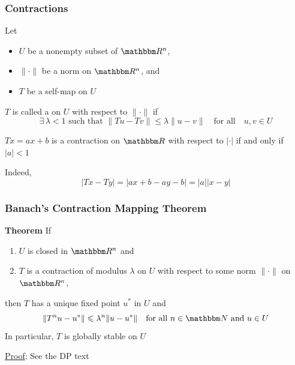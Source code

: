 \begin{frame}
    \frametitle{Contractions}
    
    Let 
    \begin{itemize}
        \item $U$ be a nonempty subset of $\RR^n$,
        \item $\| \cdot \|$ be a norm on $\RR^n$, and
        \item $T$ be a self-map on $U$

    \end{itemize}

    $T$ is called a  on $U$ with respect
    to $\| \cdot \|$ if 
    \begin{equation*}
        \text{$\exists \, \lambda < 1$ such that }
        \| Tu - Tv \| \leq \lambda \| u - v \| \quad \text{for all} \quad u, v \in U
    \end{equation*}

    \Eg $Tx = ax + b$ is a contraction on $\RR$ with respect to $| \cdot |$ 
    if and only if $|a|<1$

    Indeed, 
    \begin{equation*}
        |Tx - Ty| = |ax + b - ay - b| = |a| |x -y|
    \end{equation*}
    


\end{frame}




\begin{frame}
    \frametitle{Banach's Contraction Mapping Theorem}
    
    {\bf Theorem} If 
    \begin{enumerate}
        \item $U$ is closed in $\RR^n$ and
        \item $T$ is a contraction of modulus $\lambda$ on $U$
        with respect to some norm $\| \cdot \|$ on $\RR^n$,
    \end{enumerate}
    then $T$ has a unique fixed point $u^*$ in $U$ and 
    \begin{equation*}
        \| T^n u - u^* \| \leq \lambda^n \| u - u^* \|
        \quad \text{for all } n \in \NN \text{ and } u \in U
    \end{equation*}
    In particular, $T$ is globally stable on $U$

    \vspace{1em}

    \underline{Proof}: See the DP text

\end{frame}


